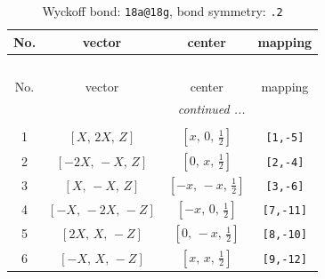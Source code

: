 \documentclass[fleqn,8pt]{jsarticle}
\begin{document}
\begin{longtable}{cccc}
\caption{Wyckoff bond: {\tt 18a@18g}, bond symmetry: {\tt .2}}
 \\
 \hline \hline
No. & vector & center & mapping \\ \hline \endfirsthead

\multicolumn{3}{l}{\tablename\ \thetable{}} \\
 \hline \hline
No. & vector & center & mapping \\ \hline \endhead

 \hline \hline
\multicolumn{3}{r}{\footnotesize\it continued ...} \\ \endfoot

 \hline \hline
\multicolumn{3}{r}{} \\ \endlastfoot

1 & $\left[ X,\, 2 X,\, Z \right]$ & $\left[ x,\, 0,\, \frac{1}{2} \right]$ & {\tt [1,-5]} \\ \hline
2 & $\left[ - 2 X,\, - X,\, Z \right]$ & $\left[ 0,\, x,\, \frac{1}{2} \right]$ & {\tt [2,-4]} \\ \hline
3 & $\left[ X,\, - X,\, Z \right]$ & $\left[ - x,\, - x,\, \frac{1}{2} \right]$ & {\tt [3,-6]} \\ \hline
4 & $\left[ - X,\, - 2 X,\, - Z \right]$ & $\left[ - x,\, 0,\, \frac{1}{2} \right]$ & {\tt [7,-11]} \\ \hline
5 & $\left[ 2 X,\, X,\, - Z \right]$ & $\left[ 0,\, - x,\, \frac{1}{2} \right]$ & {\tt [8,-10]} \\ \hline
6 & $\left[ - X,\, X,\, - Z \right]$ & $\left[ x,\, x,\, \frac{1}{2} \right]$ & {\tt [9,-12]} \\
\end{longtable}
\renewcommand{\arraystretch}{1.2}
\end{document}
